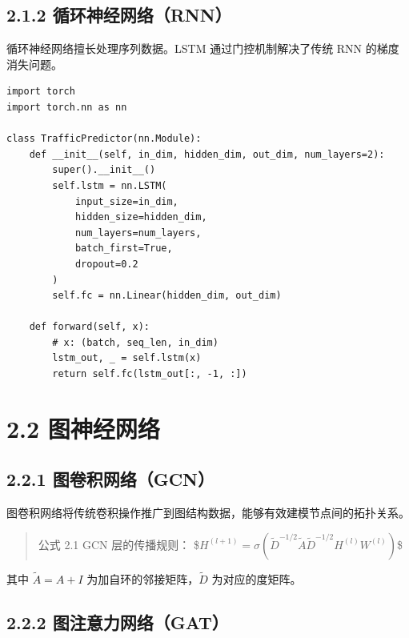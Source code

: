 \documentclass{harryopo-report}
\begin{document}
\subsection*{2.1.2 循环神经网络（RNN）}

循环神经网络擅长处理序列数据。LSTM 通过门控机制解决了传统 RNN 的梯度消失问题。

\begin{lstlisting}[style=pystyle,caption={}]
import torch
import torch.nn as nn

class TrafficPredictor(nn.Module):
    def __init__(self, in_dim, hidden_dim, out_dim, num_layers=2):
        super().__init__()
        self.lstm = nn.LSTM(
            input_size=in_dim,
            hidden_size=hidden_dim,
            num_layers=num_layers,
            batch_first=True,
            dropout=0.2
        )
        self.fc = nn.Linear(hidden_dim, out_dim)

    def forward(self, x):
        # x: (batch, seq_len, in_dim)
        lstm_out, _ = self.lstm(x)
        return self.fc(lstm_out[:, -1, :])
\end{lstlisting}

\section*{2.2 图神经网络}

\subsection*{2.2.1 图卷积网络（GCN）}

图卷积网络将传统卷积操作推广到图结构数据，能够有效建模节点间的拓扑关系。

\begin{quote}
{\fzht 公式 2.1} GCN 层的传播规则：
\$$H^{(l+1)} = \sigma\left(\tilde{D}^{-1/2} \tilde{A} \tilde{D}^{-1/2} H^{(l)} W^{(l)}\right)$\$
\end{quote}

其中 $\tilde{A} = A + I$ 为加自环的邻接矩阵，$\tilde{D}$ 为对应的度矩阵。

\subsection*{2.2.2 图注意力网络（GAT）}
\end{document}

